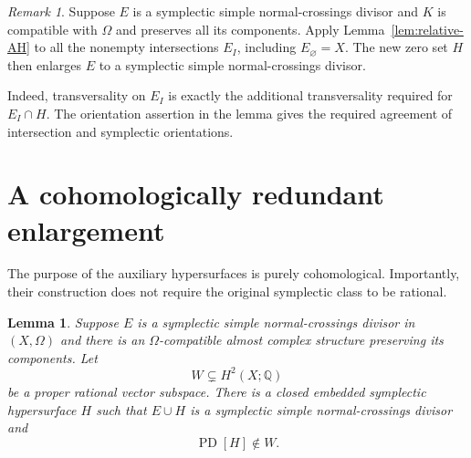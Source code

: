 \documentclass[11pt]{article}
\newtheorem{lemma}[theorem]{Lemma}
\theoremstyle{definition}
\theoremstyle{remark}
\newtheorem{remark}[theorem]{Remark}
\newcommand{\Q}{\mathbb Q}
\newcommand{\PD}{\operatorname{PD}}
\begin{document}

\begin{remark}\label{rem:relative-SNC}
Suppose $E$ is a symplectic simple normal-crossings divisor and
$K$ is compatible with $\Omega$ and preserves all its components.
Apply Lemma~\ref{lem:relative-AH} to all the nonempty intersections
$E_I$, including $E_\varnothing=X$.  The new zero set $H$
then enlarges $E$ to a symplectic simple normal-crossings divisor.

Indeed, transversality on $E_I$ is exactly the additional
transversality required for $E_I\cap H$.  The orientation assertion
in the lemma gives the required agreement of intersection and
symplectic orientations.
\end{remark}

\section{A cohomologically redundant enlargement}

The purpose of the auxiliary hypersurfaces is purely
cohomological.  Importantly, their construction does not require
the original symplectic class to be rational.

\begin{lemma}\label{lem:outside-subspace}
Suppose $E$ is a symplectic simple normal-crossings divisor in
$(X,\Omega)$ and there is an $\Omega$-compatible almost complex
structure preserving its components.  Let
\[
W\subsetneq H^2(X;\Q)
\]
be a proper rational vector subspace.  There is a closed embedded
symplectic hypersurface $H$ such that $E\cup H$ is a symplectic
simple normal-crossings divisor and
\[
\PD[H]\notin W.
\]
\end{lemma}
\end{document}
